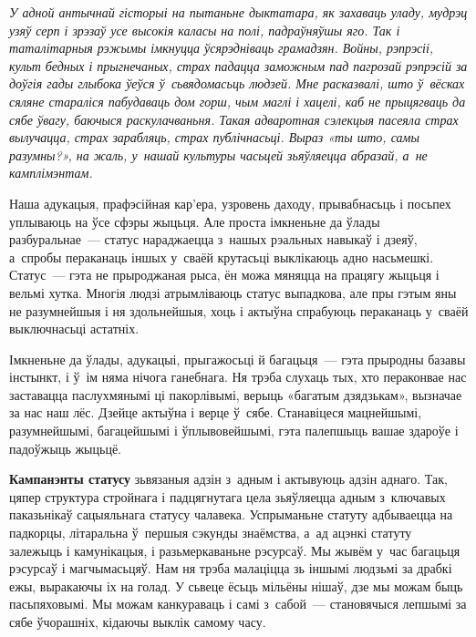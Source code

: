 \emph{У адной антычнай гісторыі на пытаньне дыктатара, як захаваць уладу, мудрэц узяў серп і зрэзаў усе высокія каласы на полі, падраўняўшы яго. Так і таталітарныя рэжымы імкнуцца ўсярэдніваць грамадзян. Войны, рэпрэсіі, культ бедных і прыгнечаных, страх падацца заможным пад пагрозай рэпрэсій за доўгія гады глыбока ўеўся ў~сьвядомасьць людзей. Мне расказвалі, што ў~вёсках сяляне стараліся пабудаваць дом горш, чым маглі і хацелі, каб не прыцягваць да сябе ўвагу, баючыся раскулачваньня. Такая адваротная сэлекцыя пасеяла страх вылучацца, страх зарабляць, страх публічнасьці. Выраз «ты што, самы разумны?», на жаль, у~нашай культуры часьцей зьяўляецца абразай, а~не камплімэнтам.}


Наша адукацыя, прафэсійная кар'ера, узровень даходу, прывабнасьць і посьпех уплываюць на ўсе сфэры жыцьця. Але проста імкненьне да ўлады разбуральнае~--- статус нараджаецца з~нашых рэальных навыкаў і дзеяў, а~спробы пераканаць іншых у~сваёй крутасьці выклікаюць адно насьмешкі. Статус~--- гэта не прыроджаная рыса, ён можа мяняцца на працягу жыцьця і вельмі хутка. Многія людзі атрымліваюць статус выпадкова, але пры гэтым яны не разумнейшыя і ня здольнейшыя, хоць і актыўна спрабуюць пераканаць у~сваёй выключнасьці астатніх.

Імкненьне да ўлады, адукацыі, прыгажосьці й багацьця~--- гэта прыродны базавы інстынкт, і ў~ім няма нічога ганебнага. Ня трэба слухаць тых, хто пераконвае нас заставацца паслухмянымі ці пакорлівымі, верыць «багатым дзядзькам», вызначае за нас наш лёс. Дзейце актыўна і верце ў~сябе. Станавіцеся мацнейшымі, разумнейшымі, багацейшымі і ўплывовейшымі, гэта палепшыць вашае здароўе і падоўжыць жыцьцё.

\textbf{Кампанэнты статусу} зьвязаныя адзін з~адным і актывуюць адзін аднаго. Так, цяпер структура стройнага і падцягнутага цела зьяўляецца адным з~ключавых паказьнікаў сацыяльнага статусу чалавека. Успрыманьне статуту адбываецца на падкорцы, літаральна ў~першыя сэкунды знаёмства, а~ад ацэнкі статуту залежыць і камунікацыя, і разьмеркаваньне рэсурсаў. Мы жывём у~час багацьця рэсурсаў і магчымасьцяў. Нам ня трэба малаціцца зь іншымі людзьмі за драбкі ежы, выракаючы іх на голад. У сьвеце ёсьць мільёны нішаў, дзе мы можам быць пасьпяховымі. Мы можам канкураваць і самі з~сабой~--- становячыся лепшымі за сябе ўчорашніх, кідаючы выклік самому часу.

